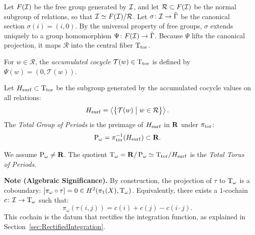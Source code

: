 \documentclass[11pt,reqno,letterpaper,twoside]{amsart}
\begin{document}
  \begin{article}
    \label{art:The Total Group of Periods}
    
    Let $F(\mathcal{I})$ be the free group generated by $\mathcal{I}$,
    and let $\mathcal{R} \subset F(\mathcal{I})$ be the normal subgroup of relations,
    so that $\mathcal{I} \simeq F(\mathcal{I})/\mathcal{R}$.
    Let $\sigma \colon \mathcal{I} \to \tilde{\Gamma}$ be the canonical section $\sigma(i) = (i, 0)$.
    By the universal property of free groups,
    $\sigma$ extends uniquely to a group homomorphism $\Psi \colon F(\mathcal{I}) \to \tilde{\Gamma}$.
    Because $\Psi$ lifts the canonical projection,
    it maps $\mathcal{R}$ into the central fiber $\mathrm{T}_{\mathrm{tor}}$.
    
    For $w \in \mathcal{R}$,
    the \emph{accumulated cocycle} $\mathcal{T}(w) \in \mathrm{T}_{\mathrm{tor}}$ is defined by $\Psi(w) = (0, \mathcal{T}(w))$.
    
    \begin{definition}
      Let $H_{\mathrm{surf}} \subset \mathrm{T}_{\mathrm{tor}}$ be the subgroup generated by the accumulated cocycle values on all relations:
      \[
        H_{\mathrm{surf}} = \left\langle \left\{ \mathcal{T}(w) \;\big|\; w \in \mathcal{R} \right\} \right\rangle.
        \]
      The \emph{Total Group of Periods} is the preimage of $H_{\mathrm{surf}}$ in ${\mathbf{R}}$ under $\pi_{\mathrm{tor}}$:
      \[
        \operatorname{P}_\omega = \pi_{\mathrm{tor}}^{-1}(H_{\mathrm{surf}}) \subset {\mathbf{R}}.
        \]
    \end{definition}
    
    We assume $\operatorname{P}_\omega \neq {\mathbf{R}}$.
    The quotient $\mathrm{T}_\omega = {\mathbf{R}}/\operatorname{P}_\omega \simeq \mathrm{T}_{\mathrm{tor}} / H_{\mathrm{surf}}$ is the \emph{Total Torus of Periods}.
    
    \textbf{Note (Algebraic Significance).}
    By construction,
    the projection of $\tau$ to $\mathrm{T}_\omega$ is a coboundary:
    $[\pi_\omega \circ \tau] = 0 \in H^2(\pi_1(X), \mathrm{T}_\omega)$.
    Equivalently,
    there exists a $1$-cochain $c \colon \mathcal{I} \to \mathrm{T}_\omega$ such that:
    \[
      \pi_\omega(\tau(i,j)) = c(i) + c(j) - c(i \cdot j).
      \]
    This cochain is the datum that rectifies the integration function,
    as explained in Section~\ref{sec:RectifiedIntegration}.
  \end{article}
  
  
\end{document}
